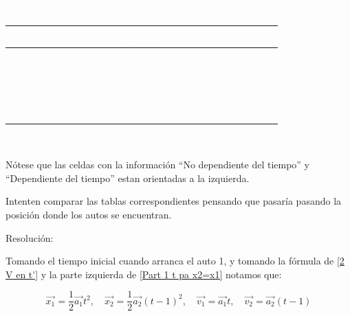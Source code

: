 \documentclass[12pt,letterpaper]{article}
\begin{document}
\begin{enumerate}
\begin{enumerate}
        \begin{table}[h]
        \centering
            \begin{tabular}{|c|c|c|c|c|c|}\hline \hline
                \multicolumn{6}{|c|}{\textcolor{white}{Auto 1}}\\\hline
                \multicolumn{3}{|l|}{\textcolor{white}{No dependiente del tiempo}} & \multicolumn{3}{|l|}{\textcolor{white}{Dependientes del tiempo}}\\\hline
                \multicolumn{3}{|c|}{\textcolor{white}{$\vec{a}[m/s^{2}]$}} & \textcolor{white}{$t[s]$} & \textcolor{white}{$\vec{x}[m]$} & \textcolor{white}{$\vec{v}[m/s]$}\\\hline
                \multicolumn{3}{|c|}{} &  &  & \\\cline{4-6}
                \multicolumn{3}{|c|}{} &  &  & \\\cline{4-6}
                \multicolumn{3}{|c|}{\textcolor{white}{Valor de la aceleración}} &  &  & \\\cline{4-6}
                \multicolumn{3}{|c|}{} &  &  & \\\cline{4-6}
                \multicolumn{3}{|c|}{} &  &  & \\\hline \hline
            \end{tabular}\\
        \caption{\textcolor{white}{Cinemática del Auto 1 (Ejemplo)}}
        \label{Cuadro 1: Cinemática del Auto 1 (Ejemplo)}
        \end{table}

            Nótese que las celdas con la información  ``No dependiente del tiempo” y ``Dependiente del tiempo” estan orientadas a la izquierda.\newline
            
            Intenten comparar las tablas correspondientes pensando que pasaría pasando la posición donde los autos se encuentran.\newline
        
            Resolución:\newline
            
            Tomando el tiempo inicial cuando arranca el auto 1, y tomando la fórmula de \ref{2 V en t'} y la parte izquierda de \ref{Part 1 t pa x2=x1} notamos que:

                \begin{equation}
                    \label{d ec's}
                    \vec{x_{1}}=\frac{1}{2}\vec{a_{1}}t^{2},\quad
                    \vec{x_{2}}=\frac{1}{2}\vec{a_{2}}(t-1)^{2},\quad
                    \vec{v_{1}}=\vec{a_{1}}t,\quad
                    \vec{v_{2}}=\vec{a_{2}}(t-1)
                \end{equation}
    

\end{enumerate}
\end{enumerate}
\end{document}
